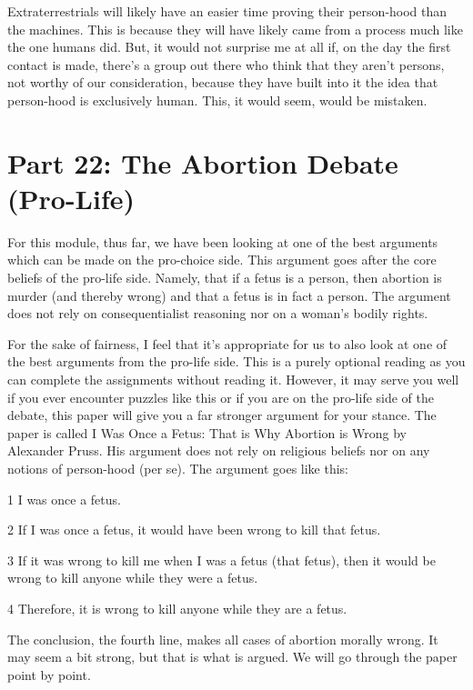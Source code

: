 Extraterrestrials will likely have an easier time proving their person-hood than the machines. This is because they will have likely came from a process much like the one humans did. But, it would not surprise me at all if, on the day the first contact is made, there's a group out there who think that they aren't persons, not worthy of our consideration, because they have built into it the idea that person-hood is exclusively human. This, it would seem, would be mistaken. 

\chapter{Part 22: The Abortion Debate (Pro-Life)}
For this module, thus far, we have been looking at one of the best arguments which can be made on the pro-choice side. This argument goes after the core beliefs of the pro-life side. Namely, that if a fetus is a person, then abortion is murder (and thereby wrong) and that a fetus is in fact a person. The argument does not rely on consequentialist reasoning nor on a woman's bodily rights.

For the sake of fairness, I feel that it's appropriate for us to also look at one of the best arguments from the pro-life side.  This is a purely optional reading as you can complete the assignments without reading it. However, it may serve you well if you ever encounter puzzles like this or if you are on the pro-life side of the debate, this paper will give you a far stronger argument for your stance. The paper is called I Was Once a Fetus: That is Why Abortion is Wrong by Alexander Pruss. His argument does not rely on religious beliefs nor on any notions of person-hood (per se). The argument goes like this:
\begin{earg}
    \item[1 ]I was once a fetus.
    \item[2 ]If I was once a fetus, it would have been wrong to kill that fetus.
    \item[3 ]If it was wrong to kill me when I was a fetus (that fetus), then it would be wrong to kill anyone while they were a fetus.
    \item[4 ]Therefore, it is wrong to kill anyone while they are a fetus.
\end{earg}
The conclusion, the fourth line, makes all cases of abortion morally wrong. It may seem a bit strong, but that is what is argued. We will go through the paper point by point.
